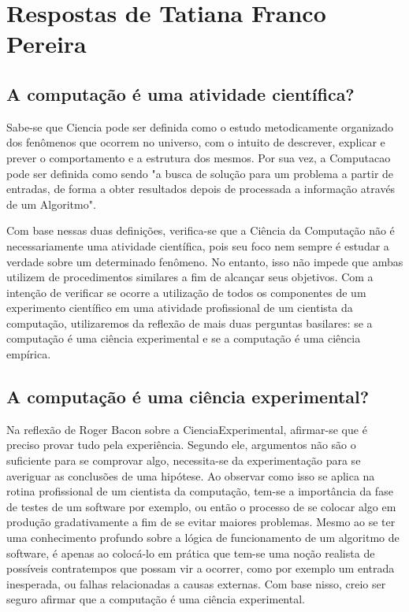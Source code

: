 \section{Respostas de Tatiana Franco Pereira\label{tarefa-Tatianafp-componentes-eperimento}}

\subsection{A computação é uma atividade científica? }

Sabe-se que \gls{Ciencia} pode ser definida como o estudo metodicamente organizado dos fenômenos que ocorrem no universo, com o intuito de descrever, explicar e prever o comportamento e a estrutura dos mesmos. Por sua vez, a \gls{Computacao} pode ser definida como sendo "a busca de solução para um problema a partir de entradas, de forma a obter resultados depois de processada a informação através de um \gls{Algoritmo}". 

Com base nessas duas definições, verifica-se que a Ciência da Computação não é necessariamente uma atividade científica, pois seu foco nem sempre é estudar a verdade sobre um determinado fenômeno. No entanto, isso não impede que ambas utilizem de procedimentos similares a fim de alcançar seus objetivos. Com a intenção de verificar se ocorre a utilização de todos os componentes de um experimento científico em uma atividade profissional de um cientista da computação, utilizaremos da reflexão de mais duas perguntas basilares: se a computação é uma ciência experimental e se a computação é uma ciência empírica.  

\subsection{A computação é uma ciência experimental? }

Na reflexão de Roger Bacon sobre a \gls{CienciaExperimental}, afirmar-se que é preciso provar tudo pela experiência. Segundo ele, argumentos não são o suficiente para se comprovar algo, necessita-se da experimentação para se averiguar as conclusões de uma hipótese. Ao observar como isso se aplica na rotina profissional de um cientista da computação, tem-se a importância da fase de testes de um software por exemplo, ou então o processo de se colocar algo em produção gradativamente a fim de se evitar maiores problemas. Mesmo ao se ter uma conhecimento profundo sobre a lógica de funcionamento de um algoritmo de software, é apenas ao colocá-lo em prática que tem-se uma noção realista de possíveis contratempos que possam vir a ocorrer, como por exemplo um entrada inesperada, ou falhas relacionadas a causas externas. Com base nisso, creio ser seguro afirmar que a computação é uma ciência experimental.

